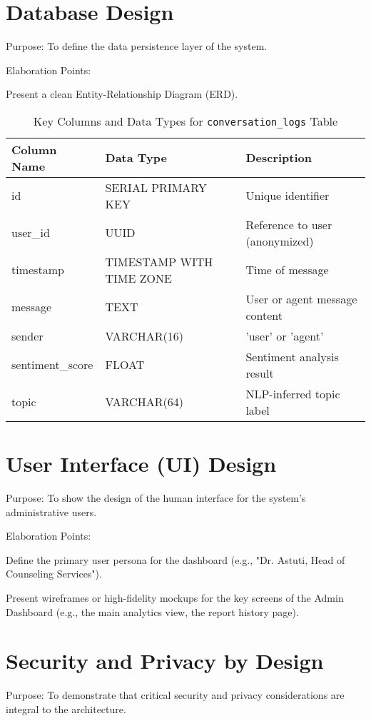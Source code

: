\section{Database Design}
Purpose: To define the data persistence layer of the system.

Elaboration Points:

Present a clean Entity-Relationship Diagram (ERD).

\begin{table}[h]
    \centering
    \caption{Key Columns and Data Types for \texttt{conversation\_logs} Table}
    \label{tab:conversation-logs}
    \begin{tabular}{|l|l|l|}
        \hline
        \textbf{Column Name} & \textbf{Data Type} & \textbf{Description} \\
        \hline
        id & SERIAL PRIMARY KEY & Unique identifier \\
        user\_id & UUID & Reference to user (anonymized) \\
        timestamp & TIMESTAMP WITH TIME ZONE & Time of message \\
        message & TEXT & User or agent message content \\
        sender & VARCHAR(16) & 'user' or 'agent' \\
        sentiment\_score & FLOAT & Sentiment analysis result \\
        topic & VARCHAR(64) & NLP-inferred topic label \\
        \hline
    \end{tabular}
\end{table}

\section{User Interface (UI) Design}
Purpose: To show the design of the human interface for the system's administrative users.

Elaboration Points:

Define the primary user persona for the dashboard (e.g., "Dr. Astuti, Head of Counseling Services").

Present wireframes or high-fidelity mockups for the key screens of the Admin Dashboard (e.g., the main analytics view, the report history page).

\section{Security and Privacy by Design}
Purpose: To demonstrate that critical security and privacy considerations are integral to the architecture.

